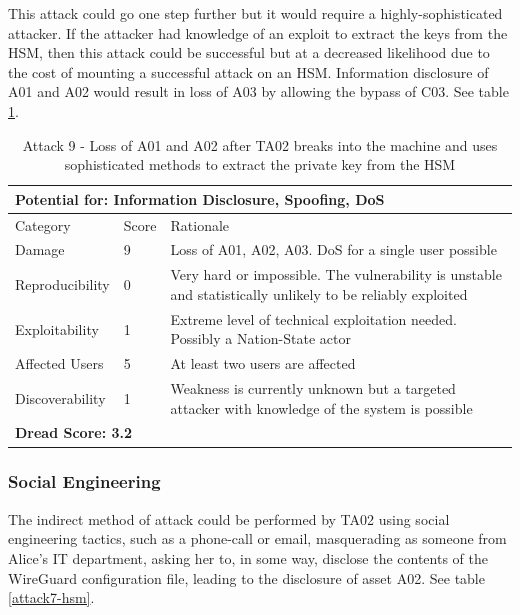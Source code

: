\documentclass [11pt, proquest] {uwthesis}[2020/02/24]
\begin{document}
This attack could go one step further but it would require a highly-sophisticated attacker. If the attacker had knowledge of an exploit to extract the keys from the HSM, then this attack could be successful but at a decreased likelihood due to the cost of mounting a successful attack on an HSM. Information disclosure of A01 and A02 would result in loss of A03 by allowing the bypass of C03. 
See table \ref{attack9-hsm}.
\begin{table}[H]
\label{attack9-hsm}
\begin{tabular}{|m{3cm}|m{.9cm}|p{27em} |}
\multicolumn{3}{l}{Potential for: Information Disclosure, Spoofing, DoS}                   \\
\hline
Category & Score & Rationale \\
\hline
Damage          & 9     & Loss of A01, A02, A03. DoS for a single user possible            \\
\hline
Reproducibility & 0     & Very hard or impossible. The vulnerability is unstable and statistically unlikely to be reliably exploited   \\
\hline
Exploitability & 1      & Extreme level of technical exploitation needed. Possibly a Nation-State actor   \\
\hline
Affected Users  & 5     & At least two users are affected                      \\
\hline
Discoverability & 1     & Weakness is currently unknown but a targeted attacker with knowledge of the system is possible   \\
\hline
\multicolumn{3}{l}{\textbf{Dread Score: 3.2}} 
\end{tabular}
\caption{Attack 9 - Loss of A01 and A02 after TA02 breaks into the machine and uses sophisticated methods to extract the private key from the HSM }
\end{table}

\subsubsection{Social Engineering}
The indirect method of attack could be performed by TA02 using social engineering tactics, such as a phone-call or email, masquerading as someone from Alice's IT department, asking her to, in some way, disclose the contents of the WireGuard configuration file, leading to the disclosure of asset A02.
See table \ref{attack7-hsm}.
\end{document}
